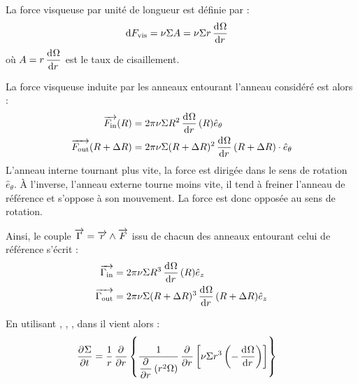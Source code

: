 


La force visqueuse par unité de longueur est définie par :
\begin{align}
\dif F_\text{vis} &= \nu \Sigma A = \nu \Sigma r \dod{\Omega}{r}
\end{align}
où $A=r \dod{\Omega}{r}$ est le taux de cisaillement.

La force visqueuse induite par les anneaux entourant l'anneau considéré est alors : 
\begin{subequations}
\begin{align}
\vect{F_\text{in}}(R)&= 2\pi\nu \Sigma R^2 \dod{\Omega}{r}(R) \hat{e}_\theta\\
\vect{F_\text{out}}(R+\Delta R)&= 2\pi\nu \Sigma (R+\Delta R)^2 \dod{\Omega}{r}(R+\Delta R) \cdot \hat{e}_\theta
\end{align}
\end{subequations}
L'anneau interne tournant plus vite, la force est dirigée dans le sens de rotation $\hat{e}_\theta$. À l'inverse, l'anneau externe tourne moins vite, il tend à freiner l'anneau de référence et s'oppose à son mouvement. La force est donc opposée au sens de rotation.

\bigskip

Ainsi, le couple $\vect{\Gamma}=\vect{r}\wedge\vect{F}$ issu de chacun des anneaux entourant celui de référence s'écrit :
\begin{subequations}
\begin{align}
\vect{\Gamma_\text{in}} &= 2\pi\nu \Sigma R^3 \dod{\Omega}{r}(R) \hat{e}_z\label{eq:G_in}\\
\vect{\Gamma_\text{out}} &= 2\pi\nu \Sigma (R+\Delta R)^3 \dod{\Omega}{r}(R+\Delta R) \hat{e}_z\label{eq:G_out}
\end{align}\label{eq:J_torques}
\end{subequations}

\bigskip

En utilisant , , , dans  il vient alors :
\begin{align}
\dpd{\Sigma}{t} &= \inv{r}\dpd{}{r}\left\{\inv{\dpd{}{r}\left(r^2\Omega\right)} \dpd{}{r}\left[\nu \Sigma r^3 \left(-\dod{\Omega}{r}\right)\right]\right\}
\end{align}

